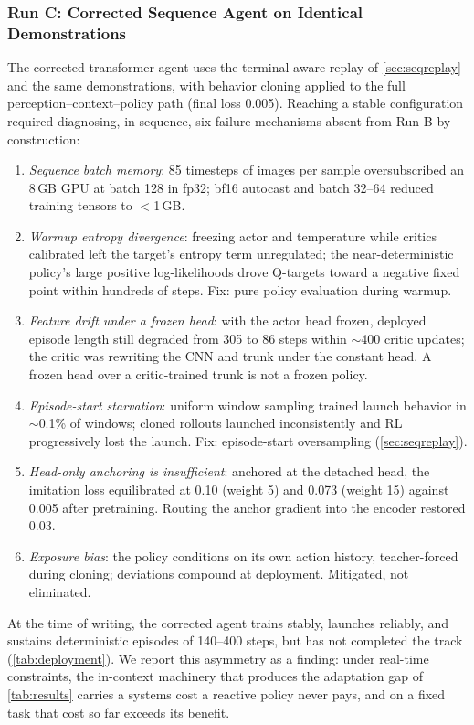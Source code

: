\documentclass[conference]{IEEEtran}
\begin{document}
\subsubsection{Run C: Corrected Sequence Agent on Identical Demonstrations}
\label{sec:runc}
The corrected transformer agent uses the terminal-aware replay of \cref{sec:seqreplay} and the same demonstrations, with behavior cloning applied to the full perception--context--policy path (final loss 0.005). Reaching a stable configuration required diagnosing, in sequence, six failure mechanisms absent from Run B by construction:
\begin{enumerate}
    \item \emph{Sequence batch memory}: 85 timesteps of images per sample oversubscribed an 8\,GB GPU at batch 128 in fp32; bf16 autocast and batch 32--64 reduced training tensors to $<$1\,GB.
    \item \emph{Warmup entropy divergence}: freezing actor and temperature while critics calibrated left the target's entropy term unregulated; the near-deterministic policy's large positive log-likelihoods drove Q-targets toward a negative fixed point within hundreds of steps. Fix: pure policy evaluation during warmup.
    \item \emph{Feature drift under a frozen head}: with the actor head frozen, deployed episode length still degraded from 305 to 86 steps within $\sim$400 critic updates; the critic was rewriting the CNN and trunk under the constant head. A frozen head over a critic-trained trunk is not a frozen policy.
    \item \emph{Episode-start starvation}: uniform window sampling trained launch behavior in $\sim$0.1\% of windows; cloned rollouts launched inconsistently and RL progressively lost the launch. Fix: episode-start oversampling (\cref{sec:seqreplay}).
    \item \emph{Head-only anchoring is insufficient}: anchored at the detached head, the imitation loss equilibrated at 0.10 (weight 5) and 0.073 (weight 15) against 0.005 after pretraining. Routing the anchor gradient into the encoder restored 0.03.
    \item \emph{Exposure bias}: the policy conditions on its own action history, teacher-forced during cloning; deviations compound at deployment. Mitigated, not eliminated.
\end{enumerate}
At the time of writing, the corrected agent trains stably, launches reliably, and sustains deterministic episodes of 140--400 steps, but has not completed the track (\cref{tab:deployment}). We report this asymmetry as a finding: under real-time constraints, the in-context machinery that produces the adaptation gap of \cref{tab:results} carries a systems cost a reactive policy never pays, and on a fixed task that cost so far exceeds its benefit.
\end{document}
